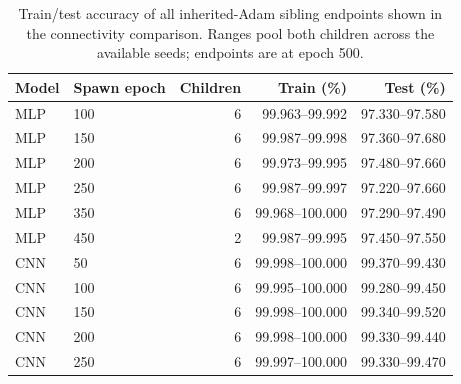 \FloatBarrier
\begin{table}[!htbp]\centering
\caption{Train/test accuracy of all inherited-Adam sibling endpoints shown in the connectivity comparison. Ranges pool both children across the available seeds; endpoints are at epoch 500.}\label{tab:perf-lmc-endpoints}
\small\begin{tabular}{llrrr}\toprule
Model & Spawn epoch & Children & Train (\%) & Test (\%)\\\midrule
MLP & 100 & 6 & 99.963--99.992 & 97.330--97.580\\
MLP & 150 & 6 & 99.987--99.998 & 97.360--97.680\\
MLP & 200 & 6 & 99.973--99.995 & 97.480--97.660\\
MLP & 250 & 6 & 99.987--99.997 & 97.220--97.660\\
MLP & 350 & 6 & 99.968--100.000 & 97.290--97.490\\
MLP & 450 & 2 & 99.987--99.995 & 97.450--97.550\\
CNN & 50 & 6 & 99.998--100.000 & 99.370--99.430\\
CNN & 100 & 6 & 99.995--100.000 & 99.280--99.450\\
CNN & 150 & 6 & 99.998--100.000 & 99.340--99.520\\
CNN & 200 & 6 & 99.998--100.000 & 99.330--99.440\\
CNN & 250 & 6 & 99.997--100.000 & 99.330--99.470\\
\bottomrule\end{tabular}\end{table}
